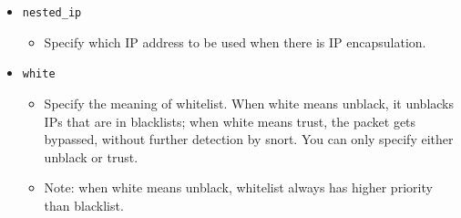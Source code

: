 \documentclass[english]{report}
\begin{document}
\begin{itemize}
\item[] \texttt{nested\_ip}
\begin{itemize}
\item[]  Specify which IP address to be used when there is IP 
           encapsulation. 
\end{itemize}

\item[] \texttt{white}
\begin{itemize}
\item[]   Specify the meaning of whitelist. When white means unblack, it 
           unblacks IPs that are in blacklists; when white means trust, the 
           packet gets bypassed, without further detection by snort. You can 
           only specify either unblack or trust.
           
 \item[]   Note: when white means unblack, whitelist always has higher priority
           than blacklist.
\end{itemize}

\end{itemize}
\end{document}
